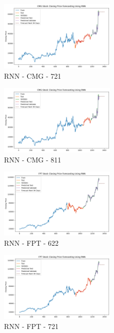 \documentclass{ieeeojies}
\begin{document}
\begin{figure} [H]
    \centering
    \includegraphics[width=0.5\textwidth]{bibliography/Figure/RNN_CMG_721_90.png}
    \caption{RNN - CMG - 721}
    \label{fig:RNN_CMG_721_90}
\end{figure}
\begin{figure} [H]
    \centering
    \includegraphics[width=0.5\textwidth]{bibliography/Figure/RNN_CMG_811_90.png}
    \caption{RNN - CMG - 811}
    \label{fig:RNN_CMG_811_90}
\end{figure}
\begin{figure} [H]
    \centering
    \includegraphics[width=0.5\textwidth]{bibliography/Figure/RNN_FPT_622_90.png}
    \caption{RNN - FPT - 622}
    \label{fig:RNN_FPT_622_90}
\end{figure}
\begin{figure} [H]
    \centering
    \includegraphics[width=0.5\textwidth]{bibliography/Figure/RNN_FPT_721_90.png}
    \caption{RNN - FPT - 721}
    \label{fig:RNN_FPT_721_90}
\end{figure}
\end{document}
